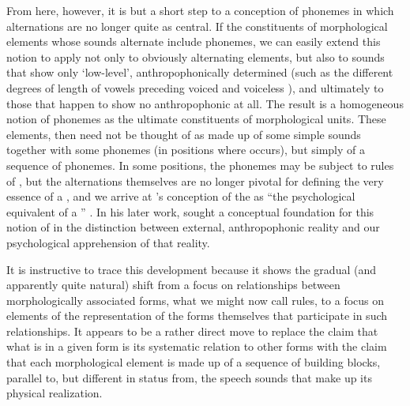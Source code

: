 From here, however, it is but a short step to a conception of phonemes
in which alternations are no longer quite as central. If the 
constituents of morphological elements whose sounds alternate include
phonemes, we can easily extend this notion to apply not only to
obviously alternating elements, but also to sounds that show only
`low-level', anthropophonically determined  (such as the
different degrees of length of  vowels preceding voiced and
voiceless ), and ultimately to those that happen to show no
anthropophonic  at all. The result is a homogeneous notion of
phonemes as the ultimate  constituents of morphological
units. These elements, then need not be thought of as made up of some
simple sounds together with some phonemes (in positions where
 occurs), but simply of a sequence of phonemes. In some
positions, the phonemes may be subject to rules of , but
the alternations themselves are no longer pivotal for defining the
very essence of a , and we arrive at {\Baudouin}'s conception of
the  as ``the psychological equivalent of a ''
\citep[152]{baudouin95:attempt}. In his later work, {\Baudouin} sought a
conceptual foundation for this notion of  in the distinction
between external, anthropophonic reality and our psychological
apprehension of that reality.

It is instructive to trace this development because it shows the
gradual (and apparently quite natural) shift from a focus on 
relationships between morphologically associated forms, what we might
now call rules, to a focus on  elements of the representation
of the forms themselves that participate in such relationships. It
appears to be a rather direct move to replace the claim that what is
 in a given form is its systematic relation to other forms
with the claim that each morphological element is made up of a
sequence of  building blocks, parallel to, but different in
status from, the speech sounds that make up its physical realization.

